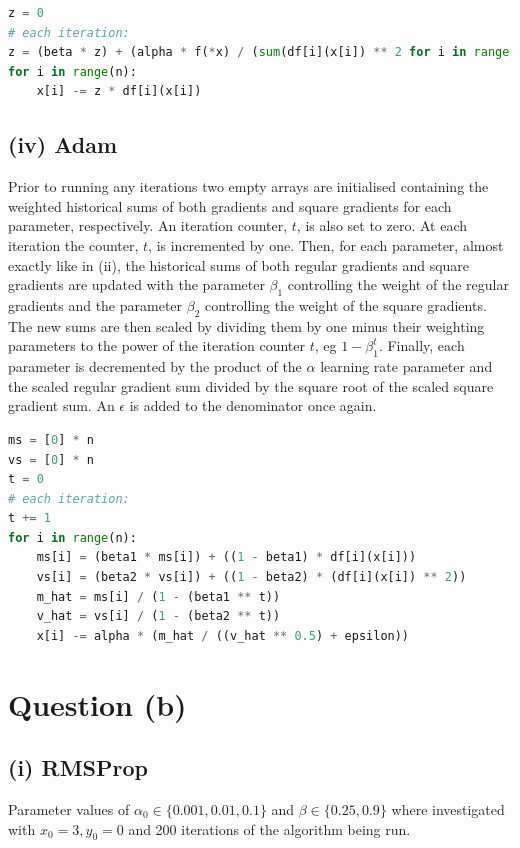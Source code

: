 \documentclass[12pt]{article}
\begin{document}
\lstset{basicstyle=\footnotesize}
\begin{lstlisting}[language=Python]
z = 0
# each iteration:
z = (beta * z) + (alpha * f(*x) / (sum(df[i](x[i]) ** 2 for i in range(n)) + epsilon))
for i in range(n):
    x[i] -= z * df[i](x[i])
\end{lstlisting}

\subsection*{(iv) Adam}

Prior to running any iterations two empty arrays are initialised containing the weighted historical sums of both gradients and square gradients for each parameter, respectively. An iteration counter, $t$, is also set to zero. At each iteration the counter, $t$, is incremented by one. Then, for each parameter, almost exactly like in (ii), the historical sums of both regular gradients and square gradients are updated with the parameter $\beta_1$ controlling the weight of the regular gradients and the parameter $\beta_2$ controlling the weight of the square gradients. The new sums are then scaled by dividing them by one minus their weighting parameters to the power of the iteration counter $t$, eg $1 - \beta_1^t$. Finally, each parameter is decremented by the product of the $\alpha$ learning rate parameter and the scaled regular gradient sum divided by the square root of the scaled square gradient sum. An $\epsilon$ is added to the denominator once again.

\lstset{basicstyle=\footnotesize}
\begin{lstlisting}[language=Python]
ms = [0] * n
vs = [0] * n
t = 0
# each iteration:
t += 1
for i in range(n):
    ms[i] = (beta1 * ms[i]) + ((1 - beta1) * df[i](x[i]))
    vs[i] = (beta2 * vs[i]) + ((1 - beta2) * (df[i](x[i]) ** 2))
    m_hat = ms[i] / (1 - (beta1 ** t))
    v_hat = vs[i] / (1 - (beta2 ** t))
    x[i] -= alpha * (m_hat / ((v_hat ** 0.5) + epsilon))
\end{lstlisting}

\section*{Question (b)}

\subsection*{(i) RMSProp}

Parameter values of $\alpha_0 \in \{0.001, 0.01, 0.1\}$ and $\beta \in \{0.25, 0.9\}$ where investigated with $x_0 = 3, y_0 = 0$ and 200 iterations of the algorithm being run.
\end{document}
